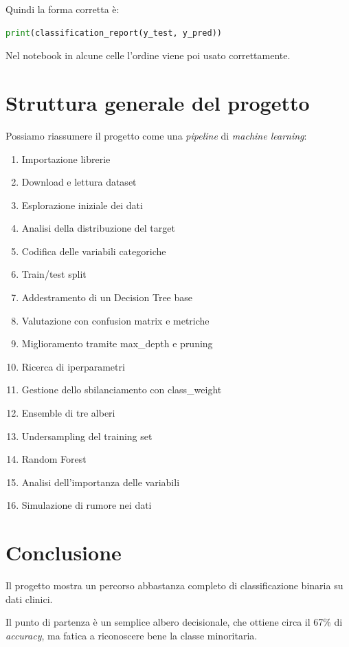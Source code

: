 \documentclass[11pt,a4paper]{article}
\begin{document}
Quindi la forma corretta è:
\begin{lstlisting}[language=Python]
print(classification_report(y_test, y_pred))
\end{lstlisting}

Nel notebook in alcune celle l'ordine viene poi usato correttamente.

\section{Struttura generale del progetto}
Possiamo riassumere il progetto come una \textit{pipeline} di \textit{machine learning}:
\begin{enumerate}
    \item Importazione librerie
    \item Download e lettura dataset
    \item Esplorazione iniziale dei dati
    \item Analisi della distribuzione del target
    \item Codifica delle variabili categoriche
    \item Train/test split
    \item Addestramento di un Decision Tree base
    \item Valutazione con confusion matrix e metriche
    \item Miglioramento tramite max\_depth e pruning
    \item Ricerca di iperparametri
    \item Gestione dello sbilanciamento con class\_weight
    \item Ensemble di tre alberi
    \item Undersampling del training set
    \item Random Forest
    \item Analisi dell'importanza delle variabili
    \item Simulazione di rumore nei dati
\end{enumerate}

\section{Conclusione}
Il progetto mostra un percorso abbastanza completo di classificazione binaria su dati clinici.

Il punto di partenza è un semplice albero decisionale, che ottiene circa il 67\% di \textit{accuracy}, ma fatica a riconoscere bene la classe minoritaria.
\end{document}
